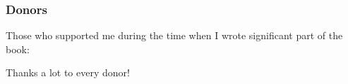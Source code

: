 



\subsubsection*{Donors}

Those who supported me during the time when I wrote significant part of the book:



Thanks a lot to every donor!
